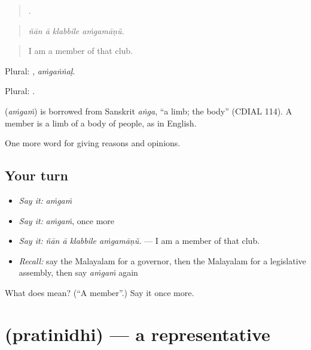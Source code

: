 \begin{quote}
   .
\end{quote}

\begin{quote}
\emph{ñān ā klabbile aṁgamāṇŭ.}
\end{quote}

\begin{quote}
I am a member of that club.
\end{quote}

Plural: , \emph{aṁgaṅṅaḷ}.

Plural: .

\begin{cousinweb}
\textbf{} (\emph{aṁgaṁ}) is borrowed from Sanskrit \emph{aṅga}, \textquotedblleft{}a limb; the body\textquotedblright{} (CDIAL 114). A member is a limb of a body of people, as in English.
\end{cousinweb}

\begin{grammarlens}[title={What you've built}]
One more word for giving reasons and opinions.
\end{grammarlens}

\subsection*{Your turn}
\begin{itemize}
\raggedright
  \item \emph{Say it:} \emph{aṁgaṁ}
  \item \emph{Say it:} \emph{aṁgaṁ}, once more
  \item \emph{Say it:} \emph{ñān ā klabbile aṁgamāṇŭ.} — I am a member of that club.
  \item \emph{Recall:} say the Malayalam for a governor, then the Malayalam for a legislative assembly, then say \emph{aṁgaṁ} again
\end{itemize}

\begin{tcolorbox}[breakable,colback=teal!4,colframe=teal!35!black,title={Before you move on}]
What does  mean? (\textquotedblleft{}A member\textquotedblright{}.) Say it once more.
\end{tcolorbox}
\section[\texorpdfstring{\ml{പ്രതിനിധി} (pratinidhi)}{പ്രതിനിധി (pratinidhi)}]{ (pratinidhi) — a representative}

